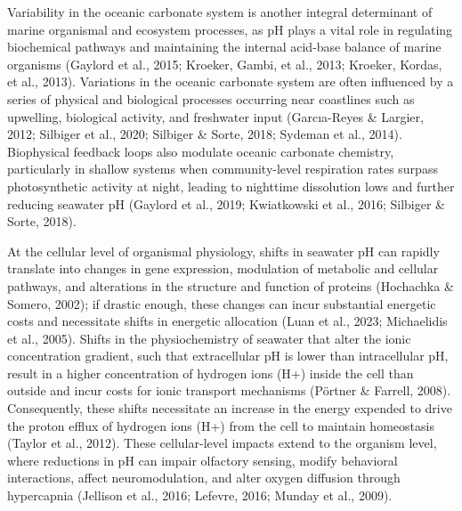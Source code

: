 \documentclass{CSUNthesis}
\begin{document}
Variability in the oceanic carbonate system is another integral determinant of marine organismal and ecosystem processes, as pH plays a vital role in regulating biochemical pathways and maintaining the internal acid-base balance of marine organisms (Gaylord et al., 2015; Kroeker, Gambi, et al., 2013; Kroeker, Kordas, et al., 2013). Variations in the oceanic carbonate system are often influenced by a series of physical and biological processes occurring near coastlines such as upwelling, biological activity, and freshwater input (Garcıa-Reyes \& Largier, 2012; Silbiger et al., 2020; Silbiger \& Sorte, 2018; Sydeman et al., 2014). Biophysical feedback loops also modulate oceanic carbonate chemistry, particularly in shallow systems when community-level respiration rates surpass photosynthetic activity at night, leading to nighttime dissolution lows and further reducing seawater pH (Gaylord et al., 2019; Kwiatkowski et al., 2016; Silbiger \& Sorte, 2018).

At the cellular level of organismal physiology, shifts in seawater pH can rapidly translate into changes in gene expression, modulation of metabolic and cellular pathways, and alterations in the structure and function of proteins (Hochachka \& Somero, 2002); if drastic enough, these changes can incur substantial energetic costs and necessitate shifts in energetic allocation (Luan et al., 2023; Michaelidis et al., 2005). Shifts in the physiochemistry of seawater that alter the ionic concentration gradient, such that extracellular pH is lower than intracellular pH, result in a higher concentration of hydrogen ions (H+) inside the cell than outside and incur costs for ionic transport mechanisms (Pörtner \& Farrell, 2008). Consequently, these shifts necessitate an increase in the energy expended to drive the proton efflux of hydrogen ions (H+) from the cell to maintain homeostasis (Taylor et al., 2012). These cellular-level impacts extend to the organism level, where reductions in pH can impair olfactory sensing, modify behavioral interactions, affect neuromodulation, and alter oxygen diffusion through hypercapnia (Jellison et al., 2016; Lefevre, 2016; Munday et al., 2009).
\end{document}
